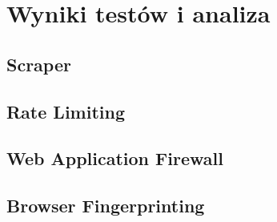 \newpage

\section{Wyniki testów i analiza}\label{sec:testy}

\subsection{Scraper}

\subsection{Rate Limiting}

\subsection{Web Application Firewall}

\subsection{Browser Fingerprinting}
